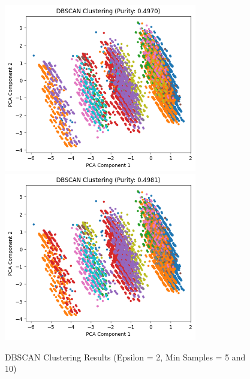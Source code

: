 \documentclass{article}
\begin{document}
\begin{figure}[H]\ContinuedFloat
\centering
\includegraphics[width=0.75\textwidth]{DBScan_2_5.png}
\includegraphics[width=0.75\textwidth]{DBScan_2_10.png}
\caption{DBSCAN Clustering Results (Epsilon = 2, Min Samples = 5 and 10)}
\end{figure}
\end{document}
